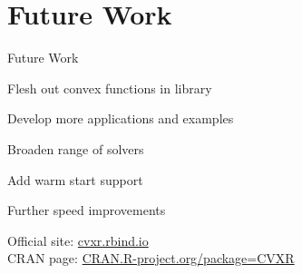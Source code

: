 \documentclass{beamer}
\begin{document}
\section{Future Work}
\begin{frame}{Future Work}
	\BIT
		\item Flesh out convex functions in library
		\item Develop more applications and examples
		\item Broaden range of solvers
		\item Add warm start support
		\item Further speed improvements
	\EIT
	
	Official site: \url{cvxr.rbind.io} \\
	CRAN page: \url{CRAN.R-project.org/package=CVXR}
\end{frame}
\end{document}
